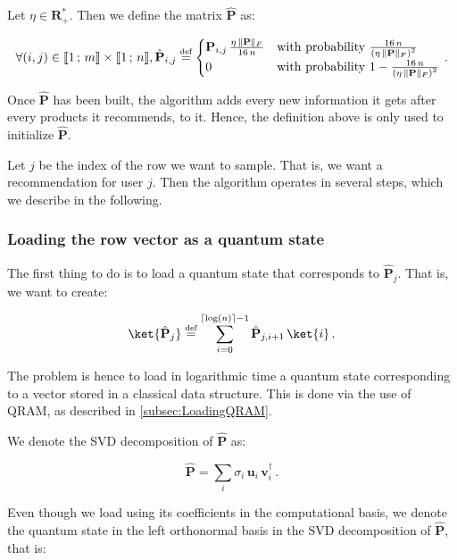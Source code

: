 \documentclass[11pt, a4paper]{article}
\begin{document}
            Let \(\eta\in\mathbf{R}_+^*\). Then we define the matrix \(\hat{\mathbf{P}}\) as:
            
            \[\forall(i, j)\in\llbracket1\,;\,m\rrbracket\times\llbracket1\,;\,n\rrbracket,\hat{\mathbf{P}}_{i,j}\overset{\text{\tiny{def}}}{=}\begin{cases}\mathbf{P}_{i,j}\,\frac{\eta\,\|\mathbf{P}\|_F}{16\,n}&\text{with probability } \frac{16\,n}{\left(\eta\,\|\mathbf{P}\|_F\right)^2}\\0&\text{with probability } 1-\frac{16\,n}{\left(\eta\,\|\mathbf{P}\|_F\right)^2}\end{cases}\,.\]
            
            Once \(\hat{\mathbf{P}}\) has been built, the algorithm adds every new information it gets after every products it recommends, to it. Hence, the definition above is only used to initialize \(\hat{\mathbf{P}}\).
            
            Let \(j\) be the index of the row we want to sample. That is, we want a recommendation for user \(j\). Then the algorithm operates in several steps, which we describe in the following.
            
            \subsubsection{Loading the row vector as a quantum state}
                \label{subsubsec:Loading}
                The first thing to do is to load a quantum state that corresponds to \(\hat{\mathbf{P}}_j\). That is, we want to create:
                
                \[\ket{\hat{\mathbf{P}}_j} \overset{\text{\tiny{def}}}{=} \sum_{i=0}^{\lceil\log(n)\rceil-1}\hat{\mathbf{P}}_{j,i + 1}\,\ket{i}\,.\]
                
                The problem is hence to load in logarithmic time a quantum state corresponding to a vector stored in a classical data structure. This is done via the use of QRAM, as described in \autoref{subsec:LoadingQRAM}.
                
                We denote the SVD decomposition of \(\hat{\mathbf{P}}\) as:
                
                \[\hat{\mathbf{P}} = \sum_{i}\sigma_i\,\mathbf{u}_i\,\mathbf{v}_i^\dagger\,.\]
                
                Even though we load  using its coefficients in the computational basis, we denote the quantum state in the left orthonormal basis in the SVD decomposition of \(\hat{\mathbf{P}}\), that is:
                
\end{document}
